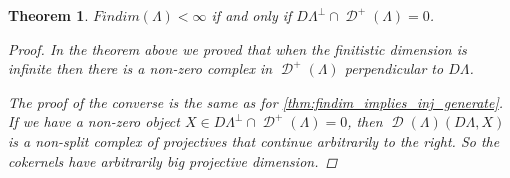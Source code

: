 \documentclass[11pt, a4paper, english]{article}
\newtheorem{theorem}{Theorem}[section]
\theoremstyle{definition}
\DeclareMathOperator{\D}{\mathcal{D}}
\begin{document}
\begin{theorem}\cite[Theorem~4.4]{Rick19}
	$Findim(\Lambda) < \infty$ if and only if $D\Lambda^\perp \cap \D^+(\Lambda) = 0$.
	\begin{proof}
		In the theorem above we proved that when the finitistic dimension is infinite then there is a non-zero complex in $\D^+(\Lambda)$ perpendicular to $D\Lambda$. 
		
		The proof of the converse is the same as for \cref{thm:findim_implies_inj_generate}. If we have a non-zero object $X \in D\Lambda^\perp \cap \D^+(\Lambda) = 0$, then $\D(\Lambda)(D\Lambda, X)$ is a non-split complex of projectives that continue arbitrarily to the right. So the cokernels have arbitrarily big projective dimension.
	\end{proof}
\end{theorem}

\clearpage


%
%

\end{document}
